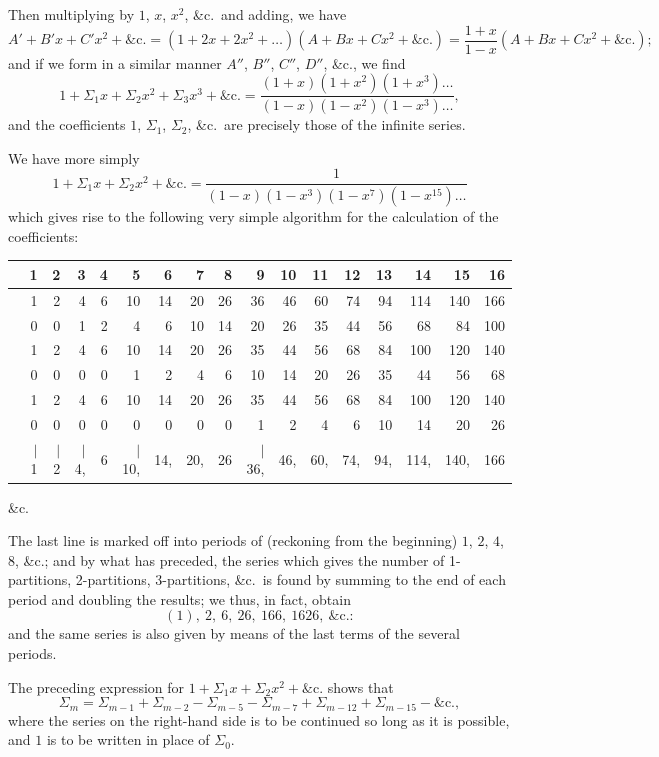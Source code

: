\documentclass[11pt,a4paper]{book}
\begin{document}
{{Then multiplying by $1$, $x$, $x^2$, \&c.\ and adding, we have
\[
A' + B'x + C'x^2 + \&\text{c.} = (1 + 2x + 2x^2 + \ldots)(A + Bx + Cx^2 + \&\text{c.}) = \frac{1+x}{1-x}(A + Bx + Cx^2 + \&\text{c.});
\]
and if we form in a similar manner $A''$, $B''$, $C''$, $D''$, \&c., we find
\[
1 + \Sigma_1 x + \Sigma_2 x^2 + \Sigma_3 x^3 + \&\text{c.} = \frac{(1+x)(1+x^2)(1+x^3)\ldots}{(1-x)(1-x^2)(1-x^3)\ldots},
\]
and the coefficients $1$, $\Sigma_1$, $\Sigma_2$, \&c.\ are precisely those of the infinite series.

We have more simply
\[
1 + \Sigma_1 x + \Sigma_2 x^2 + \&\text{c.} = \frac{1}{(1-x)(1-x^3)(1-x^7)(1-x^{15})\ldots}
\]
which gives rise to the following very simple algorithm for the calculation of the coefficients:
\begin{center}
\begin{tabular}{r|rrrrrrrrrrrrrrrr}
& 1 & 2 & 3 & 4 & 5 & 6 & 7 & 8 & 9 & 10 & 11 & 12 & 13 & 14 & 15 & 16 \\
\hline
& 1 & 2 & 4 & 6 & 10 & 14 & 20 & 26 & 36 & 46 & 60 & 74 & 94 & 114 & 140 & 166 \\
& 0 & 0 & 1 & 2 & 4 & 6 & 10 & 14 & 20 & 26 & 35 & 44 & 56 & 68 & 84 & 100 \\
& 1 & 2 & 4 & 6 & 10 & 14 & 20 & 26 & 35 & 44 & 56 & 68 & 84 & 100 & 120 & 140 \\
& 0 & 0 & 0 & 0 & 1 & 2 & 4 & 6 & 10 & 14 & 20 & 26 & 35 & 44 & 56 & 68 \\
& 1 & 2 & 4 & 6 & 10 & 14 & 20 & 26 & 35 & 44 & 56 & 68 & 84 & 100 & 120 & 140 \\
& 0 & 0 & 0 & 0 & 0 & 0 & 0 & 0 & 1 & 2 & 4 & 6 & 10 & 14 & 20 & 26 \\
\hline
& $|$ 1 & $|$ 2 & $|$ 4, & 6 & $|$ 10, & 14, & 20, & 26 & $|$ 36, & 46, & 60, & 74, & 94, & 114, & 140, & 166 \\
\end{tabular}
\end{center}
\&c.

The last line is marked off into periods of (reckoning from the beginning) $1$, $2$, $4$, $8$, \&c.; and by what has preceded, the series which gives the number of 1-partitions, 2-partitions, 3-partitions, \&c.\ is found by summing to the end of each period and doubling the results; we thus, in fact, obtain
\[
(1),\ 2,\ 6,\ 26,\ 166,\ 1626,\ \&\text{c.}:
\]
and the same series is also given by means of the last terms of the several periods.

The preceding expression for $1 + \Sigma_1 x + \Sigma_2 x^2 + \&\text{c.}$
shows that
\[
\Sigma_m = \Sigma_{m-1} + \Sigma_{m-2} - \Sigma_{m-5} - \Sigma_{m-7} + \Sigma_{m-12} + \Sigma_{m-15} - \&\text{c.},
\]
where the series on the right-hand side is to be continued so long as it is possible, and $1$ is to be written in place of $\Sigma_0$.

}}
\end{document}
